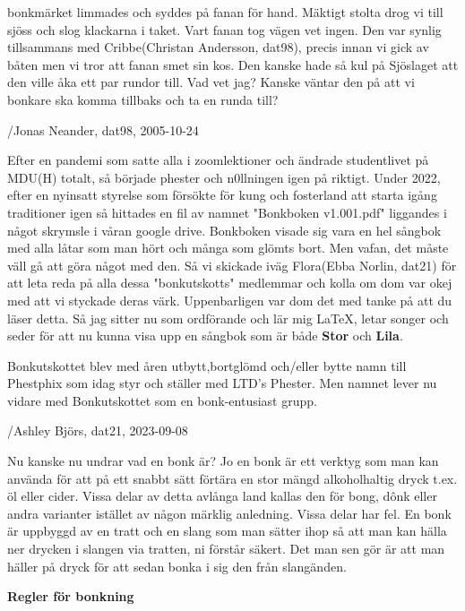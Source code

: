 bonkmärket limmades och syddes på fanan för hand. Mäktigt stolta drog vi till sjöss och slog klackarna i taket. Vart fanan tog vägen vet ingen. Den var synlig tillsammans med Cribbe(Christan Andersson, dat98), precis innan vi gick av båten men vi tror att fanan smet sin kos. Den kanske hade så kul på Sjöslaget att den ville åka ett par rundor till. Vad vet jag? Kanske väntar den på att vi bonkare ska komma tillbaks och ta en runda till? 

/Jonas Neander, dat98, 2005-10-24

Efter en pandemi som satte alla i zoomlektioner och ändrade studentlivet på MDU(H) totalt, så började phester och n0llningen igen på riktigt. Under 2022, efter en nyinsatt styrelse som försökte för kung och fosterland att starta igång traditioner igen så hittades en fil av namnet "Bonkboken v1.001.pdf" liggandes i något skrymsle i våran google drive. Bonkboken visade sig vara en hel sångbok med alla låtar som man hört och många som glömts bort. Men vafan, det måste väll gå att göra något med den. Så vi skickade iväg Flora(Ebba Norlin, dat21) för att leta reda på alla dessa "bonkutskotts" medlemmar och kolla om dom var okej med att vi styckade deras värk. Uppenbarligen var dom det med tanke på att du läser detta. Så jag sitter nu som ordförande och lär mig LaTeX, letar songer och seder för att nu kunna visa upp en sångbok som är både \textbf{Stor} och \textbf{Lila}. 

Bonkutskottet blev med åren utbytt,bortglömd och/eller bytte namn till Phestphix som idag styr och ställer med LTD's Phester. Men namnet lever nu vidare med Bonkutskottet som en bonk-entusiast grupp.

/Ashley Björs, dat21, 2023-09-08\newpage


Nu kanske nu undrar vad en bonk är? Jo en bonk är ett verktyg som man kan använda för att på ett snabbt sätt förtära en stor mängd alkoholhaltig dryck t.ex. öl eller cider. Vissa delar av detta avlånga land kallas den för bong, dônk eller andra varianter istället av någon märklig anledning. Vissa delar har fel. En bonk är uppbyggd av en tratt och en slang som man sätter ihop så att man kan hälla ner drycken i slangen via tratten, ni förstår säkert. Det man sen gör är att man häller på dryck för att sedan bonka i sig den från slangänden. 

\textbf{Regler för bonkning}


